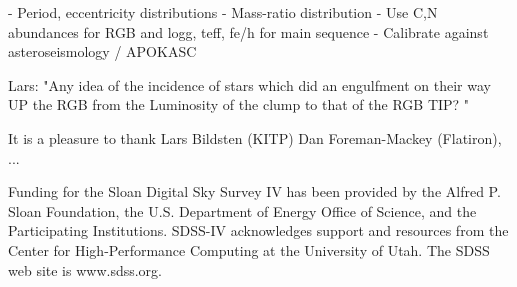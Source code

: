 \documentclass[modern]{aastex62}
\begin{document}
- Period, eccentricity distributions
- Mass-ratio distribution
     - Use C,N abundances for RGB and logg, teff, fe/h for main sequence
     - Calibrate against asteroseismology / APOKASC


Lars: "Any idea of the incidence of stars which did an engulfment on their way UP the RGB from the Luminosity of the clump to that of the RGB TIP? "


%
%
%
%
%


\acknowledgements

It is a pleasure to thank
Lars Bildsten (KITP)
Dan Foreman-Mackey (Flatiron),
...

Funding for the Sloan Digital Sky Survey IV has been provided by the Alfred P.
Sloan Foundation, the U.S. Department of Energy Office of Science, and the
Participating Institutions. SDSS-IV acknowledges support and resources from the
Center for High-Performance Computing at the University of Utah. The SDSS web
site is www.sdss.org.
\end{document}

